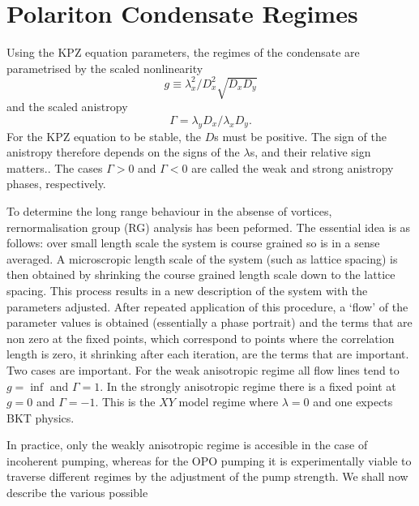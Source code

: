 \section{Polariton Condensate Regimes}

Using the KPZ equation parameters, the regimes of the condensate are parametrised by the scaled nonlinearity \[
g \equiv \lambda_x^2/D_x^2\sqrt{D_xD_y}
\]
and the scaled anistropy
\[
\Gamma = \lambda_y D_x/\lambda_x D_y.
\]
For the KPZ equation to be stable, the $D$s must be positive. The sign of the anistropy therefore depends on the signs of the $\lambda$s, and their relative sign matters.. The cases $\Gamma > 0$ and $\Gamma <0$ are called the weak and strong anistropy phases, respectively. 

To determine the long range behaviour in the absense of vortices, rernormalisation group (RG) analysis has been peformed. The essential idea is as follows: over small length scale the system is course grained so is in a sense averaged. A microscropic length scale of the system (such as lattice spacing) is then obtained by shrinking the course grained length scale down to the lattice spacing. This process results in a new description of the system with the parameters adjusted. After repeated application of this procedure, a `flow' of the parameter values is obtained (essentially a phase portrait) and the terms that are non zero at the fixed points, which correspond to points where the correlation length is zero, it shrinking after each iteration, are the terms that are important. 
Two cases are important. For the weak anisotropic regime all flow lines tend to $g=\inf$ and $\Gamma=1$. In the strongly anisotropic regime there is a fixed point at $g=0$ and $\Gamma=-1$. This is the $XY$ model regime where $\lambda=0$ and one expects BKT physics. 

In practice, only the weakly anisotropic regime is accesible in the case of incoherent pumping, whereas for the OPO pumping it is experimentally viable to traverse different regimes by the adjustment of the pump strength. We shall now describe the various possible 

